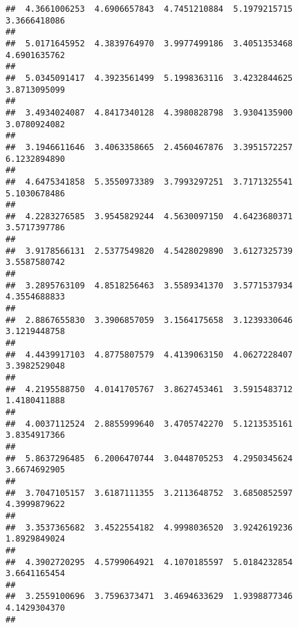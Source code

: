 \documentclass[]{article}
\begin{document}
\begin{verbatim}
##  4.3661006253  4.6906657843  4.7451210884  5.1979215715  3.3666418086 
##                                                                       
##  5.0171645952  4.3839764970  3.9977499186  3.4051353468  4.6901635762 
##                                                                       
##  5.0345091417  4.3923561499  5.1998363116  3.4232844625  3.8713095099 
##                                                                       
##  3.4934024087  4.8417340128  4.3980828798  3.9304135900  3.0780924082 
##                                                                       
##  3.1946611646  3.4063358665  2.4560467876  3.3951572257  6.1232894890 
##                                                                       
##  4.6475341858  5.3550973389  3.7993297251  3.7171325541  5.1030678486 
##                                                                       
##  4.2283276585  3.9545829244  4.5630097150  4.6423680371  3.5717397786 
##                                                                       
##  3.9178566131  2.5377549820  4.5428029890  3.6127325739  3.5587580742 
##                                                                       
##  3.2895763109  4.8518256463  3.5589341370  3.5771537934  4.3554688833 
##                                                                       
##  2.8867655830  3.3906857059  3.1564175658  3.1239330646  3.1219448758 
##                                                                       
##  4.4439917103  4.8775807579  4.4139063150  4.0627228407  3.3982529048 
##                                                                       
##  4.2195588750  4.0141705767  3.8627453461  3.5915483712  1.4180411888 
##                                                                       
##  4.0037112524  2.8855999640  3.4705742270  5.1213535161  3.8354917366 
##                                                                       
##  5.8637296485  6.2006470744  3.0448705253  4.2950345624  3.6674692905 
##                                                                       
##  3.7047105157  3.6187111355  3.2113648752  3.6850852597  4.3999879622 
##                                                                       
##  3.3537365682  3.4522554182  4.9998036520  3.9242619236  1.8929849024 
##                                                                       
##  4.3902720295  4.5799064921  4.1070185597  5.0184232854  3.6641165454 
##                                                                       
##  3.2559100696  3.7596373471  3.4694633629  1.9398877346  4.1429304370 
##                                                                       

\end{verbatim}
\end{document}
